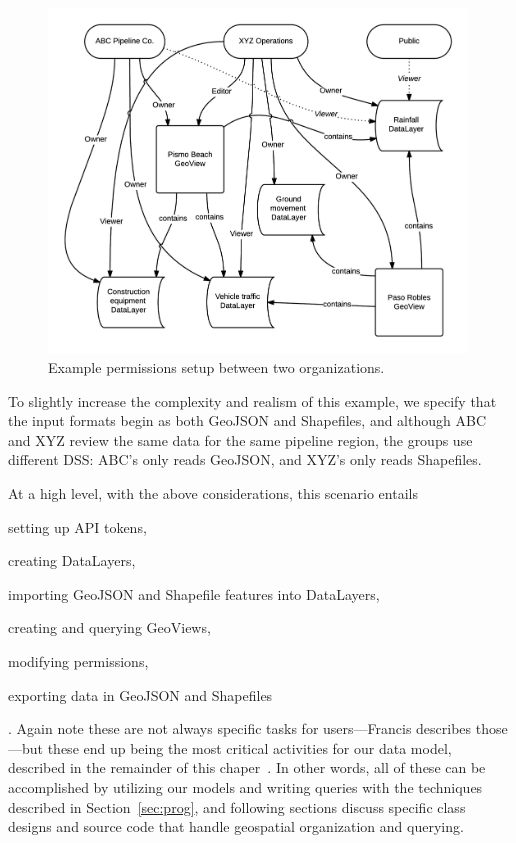 \begin{figure}[ht]
    \centering
    \includegraphics[width=0.99\textwidth]{figures/permissions.png}
    \caption{Example permissions setup between two organizations.}
    \label{fig:permissions}
\end{figure}

To slightly increase the complexity and realism of this example, we specify that the input formats begin as both GeoJSON and Shapefiles, and although ABC and XYZ review the same data for the same pipeline region, the groups use different DSS: ABC's only reads GeoJSON, and XYZ's only reads Shapefiles.

At a high level, with the above considerations, this scenario entails
\begin{enumerate*}[label=\itshape\alph*\upshape)]
\item setting up API tokens,
\item creating DataLayers,
\item importing GeoJSON and Shapefile features into DataLayers,
\item creating and querying GeoViews,
\item modifying permissions,
\item exporting data in GeoJSON and Shapefiles
\end{enumerate*}. Again note these are not always specific tasks for users---Francis describes those---but these end up being the most critical activities for our data model, described in the remainder of this chaper~\cite{Francis}. In other words, all of these can be accomplished by utilizing our models and writing queries with the techniques described in Section~\ref{sec:prog}, and following sections discuss specific class designs and source code that handle geospatial organization and querying. 

